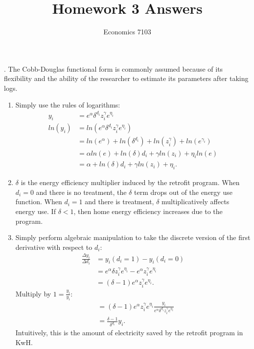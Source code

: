 \documentclass{article}
\title{Homework 3 Answers}
\author{Economics 7103}
\date{}
\begin{document}
  
\maketitle

. The Cobb-Douglas functional form is commonly assumed because of its flexibility and the ability of the researcher to estimate its parameters after taking logs.
\begin{enumerate}[label=(\alph*)]
    \item Simply use the rules of logarithms:
    \begin{align}
        y_i &= e^{\alpha} \delta^{d_i} z_i^{\gamma}  e^{\eta_i} \\
        ln(y_i) &= ln\left( e^{\alpha} \delta^{d_i} z_i^{\gamma}  e^{\eta_i} \right) \\
        & = ln\left( e^{\alpha} \right) + ln\left( \delta^{d_i} \right) + ln\left( z_i^\gamma \right) + ln\left( e^{\gamma_i} \right) \\
        & = \alpha ln(e) + ln(\delta)d_i + \gamma ln(z_i) + \eta_i ln(e) \\
        & = \alpha + ln(\delta) d_i + \gamma ln(z_i) + \eta_i.
    \end{align}
    \item $\delta$ is the energy efficiency multiplier induced by the retrofit program.  When $d_i = 0$ and there is no treatment, the $\delta$ term drops out of the energy use function.  When $d_i = 1$ and there is treatment, $\delta$ multiplicatively affects energy use.  If $\delta < 1$, then home energy efficiency increases due to the program.
    \item Simply perform algebraic manipulation to take the discrete version of the first derivative with respect to $d_i$:
    \begin{align}
        \frac{\Delta y_i}{\Delta d_i} & = y_i(d_i = 1) - y_i(d_i = 0) \\
        & = e^{\alpha} \delta z_i^{\gamma}  e^{\eta_i} - e^{\alpha} z_i^{\gamma}  e^{\eta_i} \\
        & = (\delta - 1) e^{\alpha} z_i^{\gamma}  e^{\eta_i}.
    \end{align}
    Multiply by $1 = \frac{y_i}{y_i}$:
    \begin{align}
        & = (\delta - 1) e^{\alpha} z_i^{\gamma}  e^{\eta_i} \frac{y_i}{e^{\alpha} \delta^{d_i} z_i^{\gamma}  e^{\eta_i}} \\
        & = \frac{\delta - 1}{\delta^{d_i}} y_i.
    \end{align}
    Intuitively, this is the amount of electricity saved by the retrofit program in KwH.

\end{enumerate}
\end{document}
